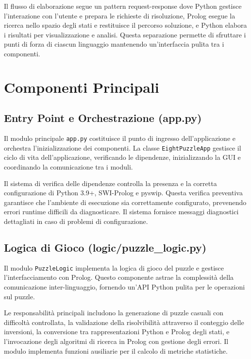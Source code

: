 \documentclass[12pt,a4paper]{report}
\theoremstyle{definition}
\begin{document}
Il flusso di elaborazione segue un pattern request-response dove Python gestisce l'interazione con l'utente e prepara le richieste di risoluzione, Prolog esegue la ricerca nello spazio degli stati e restituisce il percorso soluzione, e Python elabora i risultati per visualizzazione e analisi. Questa separazione permette di sfruttare i punti di forza di ciascun linguaggio mantenendo un'interfaccia pulita tra i componenti.

\section{Componenti Principali}

\subsection{Entry Point e Orchestrazione (app.py)}

Il modulo principale \texttt{app.py} costituisce il punto di ingresso dell'applicazione e orchestra l'inizializzazione dei componenti. La classe \texttt{EightPuzzleApp} gestisce il ciclo di vita dell'applicazione, verificando le dipendenze, inizializzando la GUI e coordinando la comunicazione tra i moduli.

Il sistema di verifica delle dipendenze controlla la presenza e la corretta configurazione di Python 3.9+, SWI-Prolog e pyswip. Questa verifica preventiva garantisce che l'ambiente di esecuzione sia correttamente configurato, prevenendo errori runtime difficili da diagnosticare. Il sistema fornisce messaggi diagnostici dettagliati in caso di problemi di configurazione.

\subsection{Logica di Gioco (logic/puzzle\_logic.py)}

Il modulo \texttt{PuzzleLogic} implementa la logica di gioco del puzzle e gestisce l'interfacciamento con Prolog. Questo componente astrae la complessità della comunicazione inter-linguaggio, fornendo un'API Python pulita per le operazioni sul puzzle.

Le responsabilità principali includono la generazione di puzzle casuali con difficoltà controllata, la validazione della risolvibilità attraverso il conteggio delle inversioni, la conversione tra rappresentazioni Python e Prolog degli stati, e l'invocazione degli algoritmi di ricerca in Prolog con gestione degli errori. Il modulo implementa funzioni ausiliarie per il calcolo di metriche statistiche.
\end{document}
